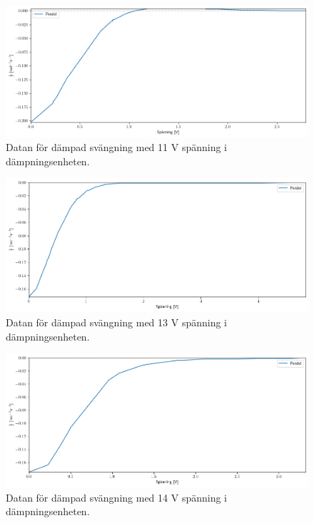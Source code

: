 \documentclass[12pt, a4paper]{article}
\begin{document}
\begin{figure}[hp]
    \includegraphics[width=\textwidth]{graf_11_v_centered}
    \caption{Datan för dämpad svängning med 11 V spänning i dämpningsenheten.}
    \label{fig:data_11_v}
\end{figure}

\begin{figure}[hp]
    \includegraphics[width=\textwidth]{graf_13_v_centered}
    \caption{Datan för dämpad svängning med 13 V spänning i dämpningsenheten.}
    \label{fig:data_13_v}
\end{figure}

\begin{figure}[hp]
    \includegraphics[width=\textwidth]{graf_14_v_centered}
    \caption{Datan för dämpad svängning med 14 V spänning i dämpningsenheten.}
    \label{fig:data_14_v}
\end{figure}
\end{document}
